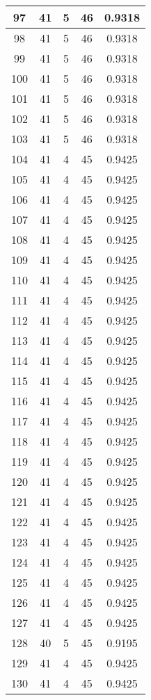 \documentclass[letterpaper, 12pt]{article}
\begin{document}
\begin{longtable}{|c|c|c|c|c|}
\hline
97 & 41 & 5 & 46 & 0.9318 \\
\hline
98 & 41 & 5 & 46 & 0.9318 \\
\hline
99 & 41 & 5 & 46 & 0.9318 \\
\hline
100 & 41 & 5 & 46 & 0.9318 \\
\hline
101 & 41 & 5 & 46 & 0.9318 \\
\hline
102 & 41 & 5 & 46 & 0.9318 \\
\hline
103 & 41 & 5 & 46 & 0.9318 \\
\hline
104 & 41 & 4 & 45 & 0.9425 \\
\hline
105 & 41 & 4 & 45 & 0.9425 \\
\hline
106 & 41 & 4 & 45 & 0.9425 \\
\hline
107 & 41 & 4 & 45 & 0.9425 \\
\hline
108 & 41 & 4 & 45 & 0.9425 \\
\hline
109 & 41 & 4 & 45 & 0.9425 \\
\hline
110 & 41 & 4 & 45 & 0.9425 \\
\hline
111 & 41 & 4 & 45 & 0.9425 \\
\hline
112 & 41 & 4 & 45 & 0.9425 \\
\hline
113 & 41 & 4 & 45 & 0.9425 \\
\hline
114 & 41 & 4 & 45 & 0.9425 \\
\hline
115 & 41 & 4 & 45 & 0.9425 \\
\hline
116 & 41 & 4 & 45 & 0.9425 \\
\hline
117 & 41 & 4 & 45 & 0.9425 \\
\hline
118 & 41 & 4 & 45 & 0.9425 \\
\hline
119 & 41 & 4 & 45 & 0.9425 \\
\hline
120 & 41 & 4 & 45 & 0.9425 \\
\hline
121 & 41 & 4 & 45 & 0.9425 \\
\hline
122 & 41 & 4 & 45 & 0.9425 \\
\hline
123 & 41 & 4 & 45 & 0.9425 \\
\hline
124 & 41 & 4 & 45 & 0.9425 \\
\hline
125 & 41 & 4 & 45 & 0.9425 \\
\hline
126 & 41 & 4 & 45 & 0.9425 \\
\hline
127 & 41 & 4 & 45 & 0.9425 \\
\hline
128 & 40 & 5 & 45 & 0.9195 \\
\hline
129 & 41 & 4 & 45 & 0.9425 \\
\hline
130 & 41 & 4 & 45 & 0.9425 \\

\end{longtable}
\end{document}
